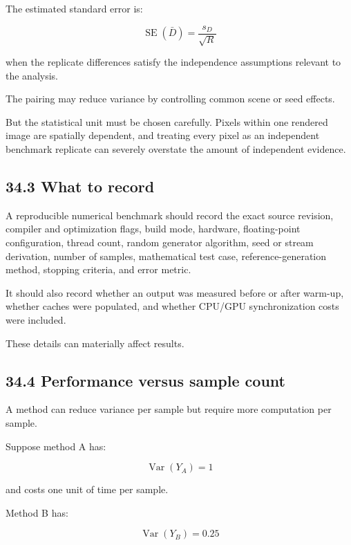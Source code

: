 The estimated standard error is:

\[ \boxed{ \operatorname{SE}(\bar D) = \frac{s_D}{\sqrt R} } \]

when the replicate differences satisfy the independence assumptions relevant to the analysis.

The pairing may reduce variance by controlling common scene or seed effects.

But the statistical unit must be chosen carefully. Pixels within one rendered image are spatially dependent, and treating every pixel as an independent benchmark replicate can severely overstate the amount of independent evidence.

\subsection{34.3 What to record}\label{02-foundations-ii-ch031-what-to-record}

\hypertarget{02-foundations-ii-ch031-what-to-record}{}

A reproducible numerical benchmark should record the exact source revision, compiler and optimization flags, build mode, hardware, floating-point configuration, thread count, random generator algorithm, seed or stream derivation, number of samples, mathematical test case, reference-generation method, stopping criteria, and error metric.

It should also record whether an output was measured before or after warm-up, whether caches were populated, and whether CPU/GPU synchronization costs were included.

These details can materially affect results.

\subsection{34.4 Performance versus sample count}\label{02-foundations-ii-ch031-performance-versus-sample-count}

\hypertarget{02-foundations-ii-ch031-performance-versus-sample-count}{}

A method can reduce variance per sample but require more computation per sample.

Suppose method A has:

\[ \operatorname{Var}(Y_A)=1 \]

and costs one unit of time per sample.

Method B has:

\[ \operatorname{Var}(Y_B)=0.25 \]

